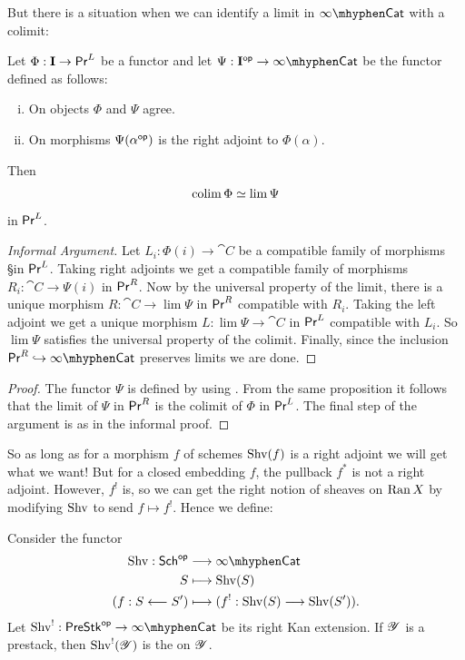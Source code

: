 \documentclass[oneside]{amsart}
\begin{document}
But there is a situation when we can identify a limit in $\iCat$ with a colimit:
\begin{proposition}\label{prop:lim-colim}
	Let $\Phi:\bb{I}\to \PrL$ be a functor and let $\Psi:\bb{I}\op\to \iCat$ be the functor defined as follows:
	\begin{enumerate}[(i)]
		\item On objects $\Phi$ and $\Psi$ agree.
		\item On morphisms $\Psi(\alpha^\mathsf{op})$ is the right adjoint to $\Phi(\alpha)$.
	\end{enumerate}
	Then
	\[
	\operatorname*{colim} \Phi \simeq \lim \Psi
	\] 
	in $\mathsf{Pr}^L$.
\end{proposition}
\begin{proof}[Informal Argument]
	Let $L_i:\Phi(i)\to \cat{C}$ be a compatible family of morphisms §in $\mathsf{Pr}^L$. Taking right adjoints we get a compatible family of morphisms $R_i:\cat{C}\to \Psi(i)$ in $\mathsf{Pr}^R$. Now by the universal property of the limit, there is a unique morphism $R:\cat{C}\to \lim \Psi$ in $\mathsf{Pr}^R$ compatible with $R_i$. Taking the left adjoint we get a unique morphism $L:\lim \Psi\to \cat{C}$ in $\mathsf{Pr}^L$ compatible with $L_i$. So $\lim \Psi$ satisfies the universal property of the colimit. Finally, since the inclusion $\PrR\injto\iCat$ \cite[Proposition~5.5.3.18]{htt} preserves limits we are done.
\end{proof}
\begin{proof}[Proof]
	The functor $\Psi$ is defined by using \cite[Proposition~5.5.3.4]{htt}. From the same proposition it follows that the limit of $\Psi$ in $\mathsf{Pr}^R$ is the colimit of $\Phi$ in $\mathsf{Pr}^L$. The final step of the argument is as in the informal proof.
\end{proof}

So as long as for a morphism $f$ of schemes $\operatorname{Shv}(f)$ is a right adjoint we will get what we want! But for a closed embedding $f$, the pullback $f^{*}$ is not a right adjoint. However, $f^{!}$ is, so we can get the right notion of sheaves on $\operatorname{Ran} X$ by modifying $\operatorname{Shv}$ to send $f\mapsto f^{!}$. Hence we define:
\begin{definition}
	Consider the functor
	\begin{align*}
		\Shv: \Sch\op &\longrightarrow \iCat \\
		S &\longmapsto \Shv(S) \\
		(f:S\from S') &\longmapsto (f^{!}:\Shv(S)\to \Shv(S')).
	\end{align*}
	Let $\Shv^{!}:\PreStk\op\to \iCat$ be its right Kan extension. If $\mathscr{Y}$ is a prestack, then $\operatorname{Shv}^{!}(\mathscr{Y})$ is the  on $\mathscr{Y}$.
\end{definition}
\end{document}
